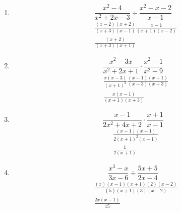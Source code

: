 \documentclass[12pt,letterpaper]{report}
\begin{document}
\begin{enumerate}
\begin{equation*}
    \left(\frac{1-2a+a^2}{4m^2-4m+1}\right) \cdot \left( \frac{(2m-1)^2}{a-1} \right)
\end{equation*}
\begin{align*}
    &\left( \frac{(a-1)^2}{(2m-1)^2}\right)\left(\frac{(2m-1)^2}{a-1} \right) \\
    &a-1
\end{align*}
\item \begin{equation*}
    \frac{x^2-4}{x^2+2x-3} \div \frac{x^2-x-2}{x-1}
\end{equation*}
\begin{align*}
    &\frac{(x-2)(x+2)}{(x+3)(x-1)}\frac{x-1}{(x+1)(x-2)}\\
    &\frac{(x+2)}{(x+3)(x+1)}
\end{align*}
\item \begin{equation*}
    \frac{x^2-3x}{x^2+2x+1} \cdot \frac{x^2-1}{x^2-9}
\end{equation*}
\begin{align*}
    &\frac{x(x-3)}{(x+1)^2}\frac{(x-1)(x+1)}{(x-3)(x+3)}\\
    &\frac{x(x-1)}{(x+1)(x+3)}
\end{align*}
\item \begin{equation*}
    \frac{x-1}{2x^2+4x+2} \cdot \frac{x+1}{x-1}
\end{equation*}
\begin{align*}
    & \frac{(x-1)(x+1)}{2(x+1)^2(x-1)}\\
    &\frac{1}{2(x+1)}
\end{align*}
\item \begin{equation*}
    \frac{x^3-x}{3x-6} \div \frac{5x+5}{2x-4}
\end{equation*}
\begin{align*}
    &\frac{(x)(x-1)(x+1)(2)(x-2)}{(5)(x+1)(3)(x-2)}\\
    &\frac{2x(x-1)}{15}
\end{align*}
\end{enumerate}
\end{document}
